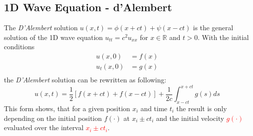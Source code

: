 \subsection{1D Wave Equation - d'Alembert}
The \textit{D'Alembert} solution $u(x,t) = \phi(x+ct)+\psi(x-ct)$ is the general solution of the 1D wave equation $u_{tt}=c^2u_{xx}$ for $x \in \mathbb{R}$ and $t>0$. With the initial conditions
\begin{align*}
    u(x,0)   & = f(x) \\
    u_t(x,0) & = g(x) \\
\end{align*}
the \textit{D'Alembert} solution can be rewritten as following:
\begin{equation*}
    u(x,t)=\frac{1}{2}\left[f(x+ct)+f(x-ct)\right]+\frac{1}{2c}\int_{x-ct}^{x+ct}g(s)ds
\end{equation*}
This form shows, that for a given position $x_i$ and time $t_i$ the result is only depending on the initial position \textcolor{mathGreen}{$f(\cdot)$} at \textcolor{mathGreen}{$x_i\pm ct_i$} and the initial velocity \textcolor{red}{$g(\cdot)$} evaluated over the interval \textcolor{red}{$x_i\pm ct_i$}.
\begin{center}
\end{center}
